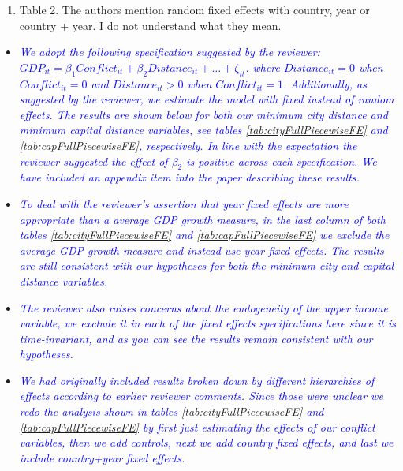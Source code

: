 \begin{enumerate}
\begin{enumerate}
	\item Table 2. The authors mention random fixed effects with country, year or country + year. I do not understand what they mean. \\	
\end{enumerate}

\begin{itemize}
\item \textcolor{blue}{\emph{
	We adopt the following specification suggested by the reviewer: $GDP_{it} = \beta_{1}Conflict_{it} + \beta_{2}Distance_{it}+\ldots+\zeta_{it}$. where $Distance_{it}=0$ when $Conflict_{it}=0$ and $Distance_{it}>0$ when $Conflict_{it}=1$. Additionally, as suggested by the reviewer, we estimate the model with fixed instead of random effects. The results are shown below for both our minimum city distance and minimum capital distance variables, see tables \ref{tab:cityFullPiecewiseFE} and \ref{tab:capFullPiecewiseFE}, respectively. In line with the expectation the reviewer suggested the effect of $\beta_{2}$ is positive across each specification. We have included an appendix item into the paper describing these results.
}} \\

\item \textcolor{blue}{\emph{
	To deal with the reviewer's assertion that year fixed effects are more appropriate than a average GDP growth measure, in the last column of both tables \ref{tab:cityFullPiecewiseFE} and \ref{tab:capFullPiecewiseFE} we exclude the average GDP growth measure and instead use year fixed effects. The results are still consistent with our hypotheses for both the minimum city and capital distance variables.
}} \\

\item \textcolor{blue}{\emph{
	The reviewer also raises concerns about the endogeneity of the upper income variable, we exclude it in each of the fixed effects specifications here since it is time-invariant, and as you can see the results remain consistent with our hypotheses.
}} \\

\item \textcolor{blue}{\emph{
	We had originally included results broken down by different hierarchies of effects according to earlier reviewer comments. Since those were unclear we redo the analysis shown in tables \ref{tab:cityFullPiecewiseFE} and \ref{tab:capFullPiecewiseFE} by first just estimating the effects of our conflict variables, then we add controls, next we add country fixed effects, and last we include country+year fixed effects.
}} \\


\end{itemize}
\end{enumerate}
